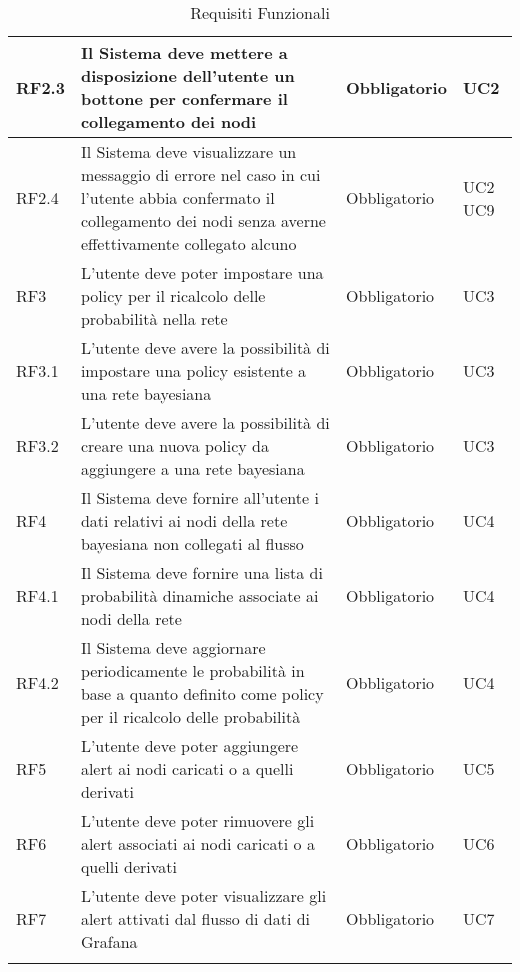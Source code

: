 \begin{center}
\begin{longtable}[c]{|m{}|m{}|m{}|m{}|}
\hline
RF2.3 & Il Sistema deve mettere a disposizione dell'utente un bottone per confermare il collegamento dei nodi & Obbligatorio & UC2\\
\hline
\rowcolor{grigio}RF2.4 & Il Sistema deve visualizzare un messaggio di errore nel caso in cui l'utente abbia confermato il collegamento dei nodi senza averne effettivamente collegato alcuno & Obbligatorio & UC2 UC9\\
\hline
RF3 & L'utente deve poter impostare una policy per il ricalcolo delle probabilità nella rete & Obbligatorio & UC3\\
\hline
\rowcolor{grigio}RF3.1 & L'utente deve avere la possibilità di impostare una policy esistente a una rete bayesiana  & Obbligatorio & UC3\\ 
\hline
RF3.2 & L'utente deve avere la possibilità di creare una nuova policy da aggiungere a una rete bayesiana & Obbligatorio & UC3\\
\hline
\rowcolor{grigio}RF4 & Il Sistema deve fornire all'utente i dati relativi ai nodi della rete bayesiana non collegati al flusso & Obbligatorio & UC4\\
\hline
RF4.1 & Il Sistema deve fornire una lista di probabilità dinamiche associate ai nodi della rete & Obbligatorio & UC4\\
\hline
\rowcolor{grigio}RF4.2 & Il Sistema deve aggiornare periodicamente le probabilità in base a quanto definito come policy per il ricalcolo delle probabilità & Obbligatorio & UC4\\
\hline
RF5 & L'utente deve poter aggiungere alert ai nodi caricati o a quelli derivati & Obbligatorio & UC5\\ 
\hline
\rowcolor{grigio}RF6 & L'utente deve poter rimuovere gli alert associati ai nodi caricati o a quelli derivati & Obbligatorio & UC6\\ 
\hline
RF7 & L'utente deve poter visualizzare gli alert attivati dal flusso di dati di Grafana & Obbligatorio & UC7\\ 
\hline
\caption{Requisiti Funzionali}
\end{longtable}
\end{center}


